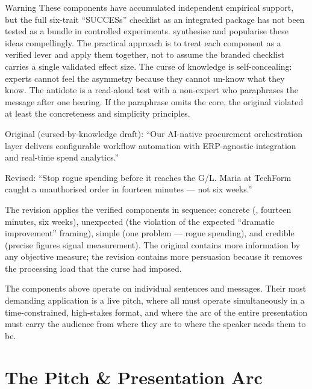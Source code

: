 \begin{admonition}{Warning}
These components have accumulated independent empirical support, but the full six-trait
``SUCCESs'' checklist as an integrated package has not been tested as a bundle in
controlled experiments. %
\textcite{heath2007madetostick} synthesise and popularise these ideas compellingly.
The practical approach is to treat each component as a verified lever and apply them
together, not to assume the branded checklist carries a single validated effect size.
The curse of knowledge is self-concealing: experts cannot feel the asymmetry because
they cannot un-know what they know. The antidote is a read-aloud test with a non-expert
who paraphrases the message after one hearing. If the paraphrase omits the core, the
original violated at least the concreteness and simplicity principles.
\end{admonition}

\begin{example}
Original (cursed-by-knowledge draft): ``Our AI-native procurement orchestration layer
delivers configurable workflow automation with ERP-agnostic integration and real-time
spend analytics.''

Revised: ``Stop rogue spending before it reaches the G/L. Maria at TechForm caught a
 unauthorised order in fourteen minutes — not six weeks.''

The revision applies the verified components in sequence: concrete (,
fourteen minutes, six weeks), unexpected (the violation of the expected ``dramatic
improvement'' framing), simple (one problem — rogue spending), and credible (precise
figures signal measurement). The original contains more information by any objective
measure; the revision contains more persuasion because it removes the processing
load that the curse had imposed.
\end{example}

The components above operate on individual sentences and messages. Their most demanding
application is a live pitch, where all must operate simultaneously in a time-constrained,
high-stakes format, and where the arc of the entire presentation must carry the audience
from where they are to where the speaker needs them to be.

\section{The Pitch \& Presentation Arc}\label{sec:pitch-arc}


